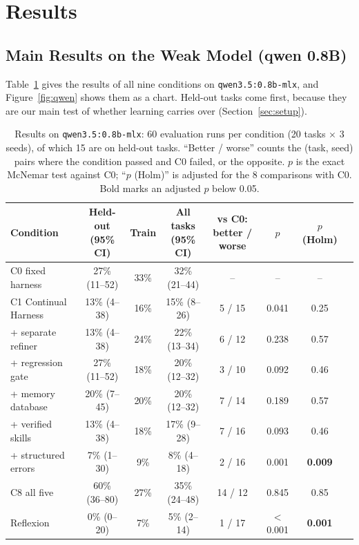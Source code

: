 \section{Results}
\label{sec:results}

\subsection{Main Results on the Weak Model (qwen 0.8B)}

Table~\ref{tab:qwen} gives the results of all nine conditions on \texttt{qwen3.5:0.8b-mlx}, and
Figure~\ref{fig:qwen} shows them as a chart. Held-out tasks come first, because they are our main
test of whether learning carries over (Section~\ref{sec:setup}).

\begin{table}[t]
\centering
\small
\setlength{\tabcolsep}{4.5pt}
\begin{tabular}{lccccccc}
\toprule
Condition & \makecell{Held-out\\(95\% CI)} & Train & \makecell{All tasks\\(95\% CI)}
  & \makecell{vs C0:\\better / worse} & $p$ & \makecell{$p$\\(Holm)} \\
\midrule
C0 fixed harness       & 27\% (11--52) & 33\% & 32\% (21--44) & --      & --      & -- \\
C1 Continual Harness   & 13\% (4--38)  & 16\% & 15\% (8--26)  & 5 / 15  & 0.041   & 0.25 \\
\midrule
+ separate refiner     & 13\% (4--38)  & 24\% & 22\% (13--34) & 6 / 12  & 0.238   & 0.57 \\
+ regression gate      & 27\% (11--52) & 18\% & 20\% (12--32) & 3 / 10  & 0.092   & 0.46 \\
+ memory database      & 20\% (7--45)  & 20\% & 20\% (12--32) & 7 / 14  & 0.189   & 0.57 \\
+ verified skills      & 13\% (4--38)  & 18\% & 17\% (9--28)  & 7 / 16  & 0.093   & 0.46 \\
+ structured errors    & 7\% (1--30)   & 9\%  & 8\% (4--18)   & 2 / 16  & 0.001   & \textbf{0.009} \\
\midrule
C8 all five            & 60\% (36--80) & 27\% & 35\% (24--48) & 14 / 12 & 0.845   & 0.85 \\
Reflexion              & 0\% (0--20)   & 7\%  & 5\% (2--14)   & 1 / 17  & $<$0.001 & \textbf{0.001} \\
\bottomrule
\end{tabular}
\caption{Results on \texttt{qwen3.5:0.8b-mlx}: 60 evaluation runs per condition (20 tasks $\times$
3 seeds), of which 15 are on held-out tasks. ``Better / worse'' counts the (task, seed) pairs where
the condition passed and C0 failed, or the opposite. $p$ is the exact McNemar test against C0;
``$p$ (Holm)'' is adjusted for the 8 comparisons with C0. Bold marks an adjusted $p$ below 0.05.}
\label{tab:qwen}
\end{table}

